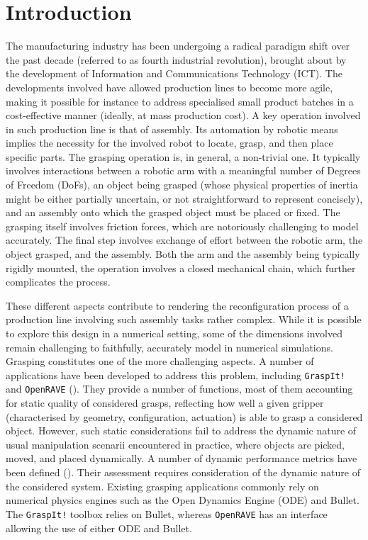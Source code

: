 \section{Introduction}\label{sec:introduction}
%
The manufacturing industry has been undergoing a radical paradigm shift over the past decade (referred to as fourth industrial revolution), brought about by the development of Information and Communications Technology (ICT). The developments involved have allowed production lines to become more agile, making it possible for instance to address specialised small product batches in a cost-effective manner (ideally, at mass production cost). A key operation involved in such production line is that of assembly. Its automation by robotic means implies the necessity for the involved robot to locate, grasp, and then place specific parts. The grasping operation is, in general, a non-trivial one. It typically involves interactions between a robotic arm with a meaningful number of Degrees of Freedom (DoFs), an object being grasped (whose physical properties of inertia might be either partially uncertain, or not straightforward to represent concisely), and an assembly onto which the grasped object must be placed or fixed. The grasping itself involves friction forces, which are notoriously challenging to model accurately. The final step involves exchange of effort between the robotic arm, the object grasped, and the assembly. Both the arm and the assembly being typically rigidly mounted, the operation involves a closed mechanical chain, which further complicates the process.

These different aspects contribute to rendering the reconfiguration process of a production line involving such assembly tasks rather complex. While it is possible to explore this design in a numerical setting, some of the dimensions involved remain challenging to faithfully, accurately model in numerical simulations. Grasping constitutes one of the more challenging aspects. A number of applications have been developed to address this problem, including \texttt{GraspIt!} and \texttt{OpenRAVE} (\cite{graspit, openrave}). They provide a number of functions, most of them accounting for static quality of considered grasps, reflecting how well a given gripper (characterised by geometry, configuration, actuation) is able to grasp a considered object. However, such static considerations fail to address the dynamic nature of usual manipulation scenarii encountered in practice, where objects are picked, moved, and placed dynamically. A number of dynamic performance metrics have been defined (\cite{roa_grasp_metrics}). Their assessment requires consideration of the dynamic nature of the considered system. Existing grasping applications commonly rely on numerical physics engines such as the Open Dynamics Engine ({ODE}) and {Bullet}. The \texttt{GraspIt!} toolbox relies on Bullet, whereas \texttt{OpenRAVE} has an interface allowing the use of either ODE and Bullet.

